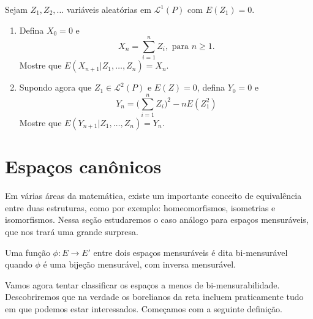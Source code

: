 \begin{exercise}
  Sejam $Z_1, Z_2, \dots$ variáveis aleatórias \iid em $\mathcal{L}^1(P)$ com $E(Z_1) = 0$.
  \begin{enumerate}[\quad a)]
  \item Defina $X_0 = 0$ e
    \begin{equation}
      X_n = \sum_{i = 1}^n Z_i, \text{ para $n \geq 1$.}
    \end{equation}
    Mostre que $E(X_{n + 1} | Z_1, \dots, Z_n) = X_n$.
  \item Supondo agora que $Z_1 \in \mathcal{L}^2(P)$ e $E(Z) = 0$, defina $Y_0 = 0$ e
    \begin{equation}
      Y_n = \Big( \sum_{i = 1}^n Z_i \Big)^2 - n E(Z_1^2)
    \end{equation}
    Mostre que $E(Y_{n + 1} | Z_1, \dots, Z_n) = Y_n$.
  \end{enumerate}
\end{exercise}





\section{Espaços canônicos}

Em várias áreas da matemática, existe um importante conceito de equivalência entre duas estruturas, como por exemplo: homeomorfismos, isometrias e isomorfismos.
Nessa seção estudaremos o caso análogo para espaços mensuráveis, que nos trará uma grande surpresa.

\begin{definition}
  Uma função $\phi:E \to E'$ entre dois espaços mensuráveis é dita bi-mensurável  quando $\phi$ é uma bijeção mensurável, com inversa mensurável.
\end{definition}

Vamos agora tentar classificar os espaços a menos de bi-mensurabilidade.
Descobriremos que na verdade os borelianos da reta incluem praticamente tudo em que podemos estar interessados.
Começamos com a seguinte definição.

